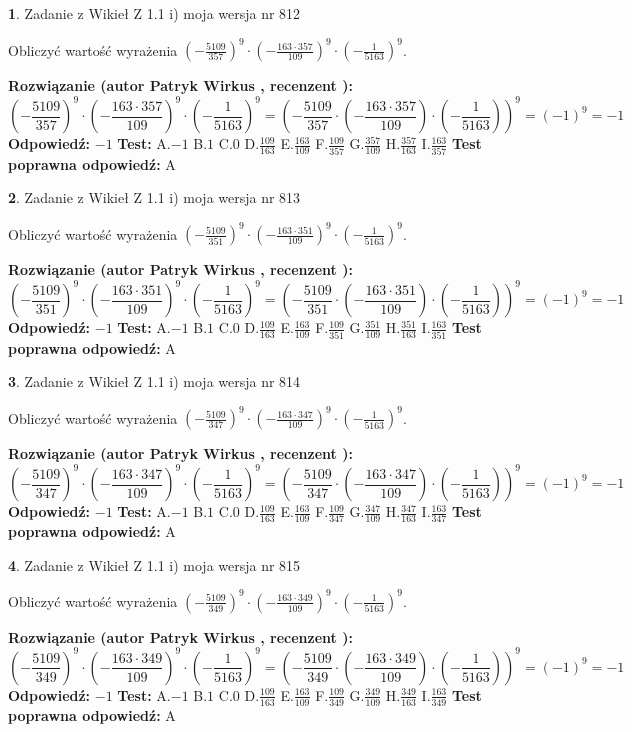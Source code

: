 \documentclass[12pt, a4paper]{article}
\theoremstyle{definition} %
\newtheorem{zad}{}
\newcommand{\zadStart}[1]{\begin{zad}#1\newline}
\newcommand{\zadStop}{\end{zad}}
\newcommand{\rozwStart}[2]{\noindent \textbf{Rozwiązanie (autor #1 , recenzent #2): }\newline}
\newcommand{\rozwStop}{\newline}
\newcommand{\odpStart}{\noindent \textbf{Odpowiedź:}\newline}
\newcommand{\odpStop}{\newline}
\newcommand{\testStart}{\noindent \textbf{Test:}\newline}
\newcommand{\testStop}{\newline}
\newcommand{\kluczStart}{\noindent \textbf{Test poprawna odpowiedź:}\newline}
\newcommand{\kluczStop}{\newline}
\begin{document}
\zadStart{Zadanie z Wikieł Z 1.1 i) moja wersja nr 812}

Obliczyć wartość wyrażenia $(-\frac{5109}{357})^{9} \cdot (-\frac{163 \cdot 357}{109})^{9} \cdot (-\frac{1}{5163})^{9}$.
\zadStop
\rozwStart{Patryk Wirkus}{}
$$(-\frac{5109}{357})^{9} \cdot (-\frac{163 \cdot 357}{109})^{9} \cdot (-\frac{1}{5163})^{9} = (-\frac{5109}{357} \cdot (-\frac{163 \cdot 357}{109}) \cdot (-\frac{1}{5163}))^{9} = (-1)^{9} = -1$$
\rozwStop
\odpStart
$-1$
\odpStop
\testStart
A.$-1$ B.$1$ C.$0$ D.$\frac{109}{163}$ E.$\frac{163}{109}$
F.$\frac{109}{357}$ G.$\frac{357}{109}$
H.$\frac{357}{163}$
I.$\frac{163}{357}$
\testStop
\kluczStart
A
\kluczStop



\zadStart{Zadanie z Wikieł Z 1.1 i) moja wersja nr 813}

Obliczyć wartość wyrażenia $(-\frac{5109}{351})^{9} \cdot (-\frac{163 \cdot 351}{109})^{9} \cdot (-\frac{1}{5163})^{9}$.
\zadStop
\rozwStart{Patryk Wirkus}{}
$$(-\frac{5109}{351})^{9} \cdot (-\frac{163 \cdot 351}{109})^{9} \cdot (-\frac{1}{5163})^{9} = (-\frac{5109}{351} \cdot (-\frac{163 \cdot 351}{109}) \cdot (-\frac{1}{5163}))^{9} = (-1)^{9} = -1$$
\rozwStop
\odpStart
$-1$
\odpStop
\testStart
A.$-1$ B.$1$ C.$0$ D.$\frac{109}{163}$ E.$\frac{163}{109}$
F.$\frac{109}{351}$ G.$\frac{351}{109}$
H.$\frac{351}{163}$
I.$\frac{163}{351}$
\testStop
\kluczStart
A
\kluczStop



\zadStart{Zadanie z Wikieł Z 1.1 i) moja wersja nr 814}

Obliczyć wartość wyrażenia $(-\frac{5109}{347})^{9} \cdot (-\frac{163 \cdot 347}{109})^{9} \cdot (-\frac{1}{5163})^{9}$.
\zadStop
\rozwStart{Patryk Wirkus}{}
$$(-\frac{5109}{347})^{9} \cdot (-\frac{163 \cdot 347}{109})^{9} \cdot (-\frac{1}{5163})^{9} = (-\frac{5109}{347} \cdot (-\frac{163 \cdot 347}{109}) \cdot (-\frac{1}{5163}))^{9} = (-1)^{9} = -1$$
\rozwStop
\odpStart
$-1$
\odpStop
\testStart
A.$-1$ B.$1$ C.$0$ D.$\frac{109}{163}$ E.$\frac{163}{109}$
F.$\frac{109}{347}$ G.$\frac{347}{109}$
H.$\frac{347}{163}$
I.$\frac{163}{347}$
\testStop
\kluczStart
A
\kluczStop



\zadStart{Zadanie z Wikieł Z 1.1 i) moja wersja nr 815}

Obliczyć wartość wyrażenia $(-\frac{5109}{349})^{9} \cdot (-\frac{163 \cdot 349}{109})^{9} \cdot (-\frac{1}{5163})^{9}$.
\zadStop
\rozwStart{Patryk Wirkus}{}
$$(-\frac{5109}{349})^{9} \cdot (-\frac{163 \cdot 349}{109})^{9} \cdot (-\frac{1}{5163})^{9} = (-\frac{5109}{349} \cdot (-\frac{163 \cdot 349}{109}) \cdot (-\frac{1}{5163}))^{9} = (-1)^{9} = -1$$
\rozwStop
\odpStart
$-1$
\odpStop
\testStart
A.$-1$ B.$1$ C.$0$ D.$\frac{109}{163}$ E.$\frac{163}{109}$
F.$\frac{109}{349}$ G.$\frac{349}{109}$
H.$\frac{349}{163}$
I.$\frac{163}{349}$
\testStop
\kluczStart
A
\kluczStop
\end{document}
